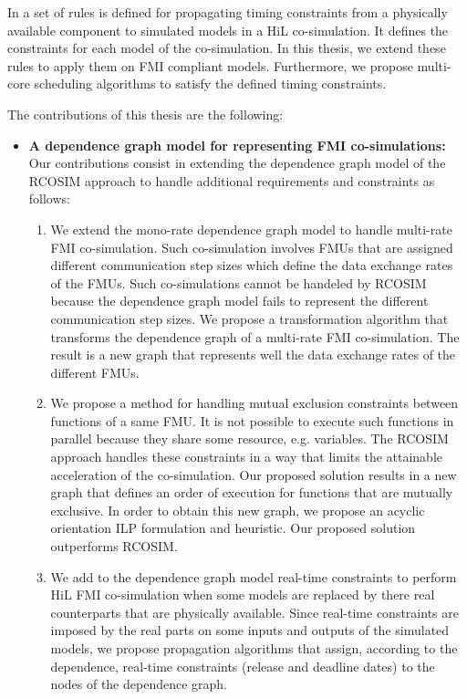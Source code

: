 In \cite{faure:2011} a set of rules is defined for propagating timing constraints from a physically available component to simulated models in a HiL co-simulation. It defines the constraints for each model of the co-simulation. In this thesis, we extend these rules to apply them on FMI compliant models. Furthermore, we propose multi-core scheduling algorithms to satisfy the defined timing constraints.

The contributions of this thesis are the following:

\begin{itemize}

\item \textbf{A dependence graph model for representing FMI co-simulations:} Our contributions consist in extending the dependence graph model of the RCOSIM approach to handle additional requirements and constraints as follows:

\begin{enumerate}

\item We extend the mono-rate dependence graph model to handle multi-rate FMI co-simulation. Such co-simulation involves FMUs that are assigned different communication step
sizes which define the data exchange rates of the FMUs. Such co-simulations cannot be handeled by RCOSIM because the dependence graph model fails to represent the different communication step sizes. We propose a transformation algorithm that transforms the dependence graph of a multi-rate FMI co-simulation. The result is a new graph that represents well the data exchange rates of the different FMUs.

\item We propose a method for handling mutual exclusion constraints between functions of a same FMU.  It is not possible to execute such functions in parallel because they share some resource, e.g. variables. The RCOSIM approach handles these constraints in a way that limits the attainable acceleration of the co-simulation. Our proposed solution results in a new graph that defines an order of execution for functions that are mutually exclusive. In order to obtain this new graph, we propose an acyclic orientation ILP formulation and heuristic. Our proposed solution outperforms RCOSIM.

\item We add to the dependence graph model real-time constraints to perform HiL FMI co-simulation when some models are replaced by there real counterparts that are physically available. Since real-time constraints are  imposed by the real parts on some inputs and outputs of the simulated models, we propose propagation algorithms that assign, according to the dependence, real-time constraints (release and deadline dates) to the nodes of the dependence graph. 


\end{enumerate}
\end{itemize}
